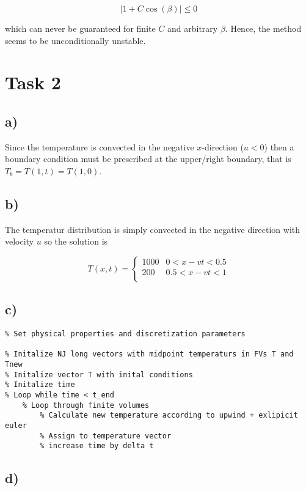 \documentclass{article}
\begin{document}
\begin{equation}
 	|1+ C\cos(\beta)| \leq 0
\end{equation}

which can never be guaranteed for finite $C$ and arbitrary $\beta$. Hence, the method seems to be unconditionally unstable. 

\section{Task 2}

\subsection{a)}
Since the temperature is convected in the negative $x$-direction ($u<0$) then a boundary condition must be prescribed at the upper/right boundary, that is $T_b = T(1,t) = T(1,0)$.

\subsection{b)}

The temperatur distribution is simply convected in the negative direction with velocity $u$ so the solution is

\begin{equation}
T(x,t) =
	\begin{cases}
	1000	&0  < x-vt < 0.5 \\
	200 	 & 0.5 < x-vt < 1 \\   
	\end{cases}
\end{equation}

\subsection{c)}

\begin{lstlisting}
% Set physical properties and discretization parameters

% Initalize NJ long vectors with midpoint temperaturs in FVs T and Tnew
% Initalize vector T with inital conditions
% Initalize time 
% Loop while time < t_end
	% Loop through finite volumes
		% Calculate new temperature according to upwind + exlipicit euler
		% Assign to temperature vector 
		% increase time by delta t
\end{lstlisting}

\newpage
\subsection{d)}

\end{document}
